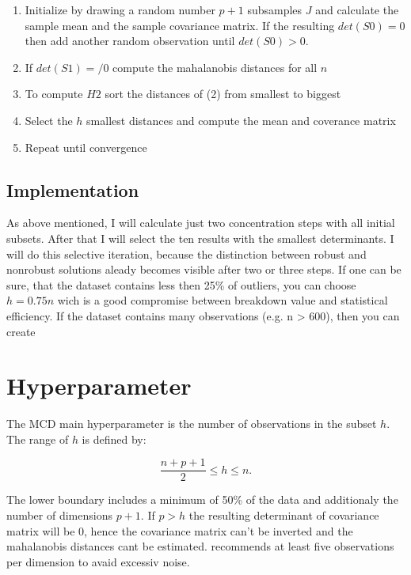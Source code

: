 \begin{enumerate}
    \item Initialize by drawing a random number $p+1$ subsamples $J$ and calculate the sample mean and the sample covariance matrix. If the resulting $det(S0)=0$ then add another random observation until $det(S0)>0$.
    \item If $det(S1)=/0$ compute the mahalanobis distances for all $n$
    \item To compute $H2$ sort the distances of (2) from smallest to biggest
    \item Select the $h$ smallest distances and compute the mean and coverance matrix
    \item Repeat until convergence
\end{enumerate}
\citep[p.214]{rousseeuw1999fast}


\subsection*{Implementation}
As above mentioned, I will calculate just two concentration steps with all initial subsets.
After that I will select the ten results with the smallest determinants.
I will do this selective iteration, because the distinction between robust and nonrobust solutions aleady becomes visible after two or three steps.  
If one can be sure, that the dataset contains less then 25\% of outliers, you can choose $h=0.75n$ wich is a good compromise between breakdown value and statistical efficiency.
If the dataset contains many observations (e.g. n > 600), then you can create


\section*{Hyperparameter}
The MCD main hyperparameter is the number of observations in the subset $h$.
The range of $h$ is defined by: 


\begin{equation}
    \frac{n+p+1}{2} \le h \le n. 
\end{equation}


The lower boundary includes a minimum of 50\% of the data and additionaly the number of dimensions $p+1$.
If $p > h$ the resulting determinant of covariance matrix will be 0, hence the covariance matrix can't be inverted and the mahalanobis distances cant be estimated.
\citet{hubert2018minimum} recommends at least five observations per dimension to avaid excessiv noise. 

